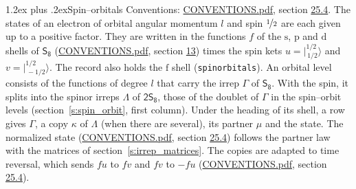 \documentclass[10pt,a4paper]{article}
\makeatletter
\renewcommand\section{\@startsection{section}{1}{\z@}{-3ex plus -1ex minus -.2ex}%
  {1.2ex plus .2ex}{\normalfont\large\sffamily\bfseries\color{parttitle}}}
\numberwithin{equation}{section}
\newcommand{\grp}[1]{\mathsf{#1}}
\newcommand{\orbital}[1]{\mathrm{#1}}
\newcommand{\mult}{\kappa}
\newcommand{\intx}{\mu}
\newcommand{\jm}[2]{\bigl\lvert{}^{#1}_{\,#2}\bigr\rangle}
\makeatother
\begin{document}
\section{Spin--orbitals}\label{s:spin_orbitals}
Conventions: \href{../../CONVENTIONS.pdf}{CONVENTIONS.pdf}, section \href{../../CONVENTIONS.pdf\#conv.25.4}{25.4}.
\leavevmode\label{n:index.orbital.l}The states of an electron of orbital angular momentum $l$ and spin $\nicefrac{1}{2}$ are each given up to a positive factor. \label{n:local.spinor.uv}\label{n:local.function.f}They are written in the functions $f$ of the $\orbital{s}$, $\orbital{p}$ and $\orbital{d}$ shells of \href{../../../rotation/data/pdf/S8.pdf}{$\grp{S_{8}}$} (\href{../../CONVENTIONS.pdf}{CONVENTIONS.pdf}, section \href{../../../rotation/CONVENTIONS.pdf\#conv.13}{13}) times the spin kets $u = \jm{1/2}{1/2}$ and $v = \jm{1/2}{-1/2}$. The record also holds the $\orbital{f}$ shell (\texttt{spinorbitals}). An orbital level consists of the functions of degree $l$ that carry the irrep $\Gamma$ of \href{../../../rotation/data/pdf/S8.pdf}{$\grp{S_{8}}$}. With the spin, it splits into the spinor irreps $\Lambda$ of $\grp{2S_{8}}$, those of the doublet of $\Gamma$ in the spin--orbit levels (section~\ref{s:spin_orbit}, first column). \label{n:head.state}Under the heading of its shell, a row gives $\Gamma$, a copy $\mult$ of $\Lambda$ (when there are several), its partner $\intx$ and the state. The normalized state (\href{../../CONVENTIONS.pdf}{CONVENTIONS.pdf}, section \href{../../CONVENTIONS.pdf\#conv.25.4}{25.4}) follows the partner law with the matrices of section~\ref{s:irrep_matrices}. The copies are adapted to time reversal, which sends $f u$ to $f v$ and $f v$ to $-f u$ (\href{../../CONVENTIONS.pdf}{CONVENTIONS.pdf}, section \href{../../CONVENTIONS.pdf\#conv.25.4}{25.4}).
\end{document}
